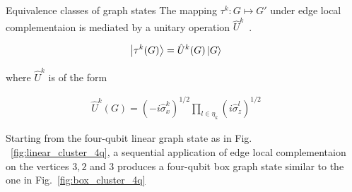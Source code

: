 \documentclass[final]{beamer}
\newlength{\sepwidth}
\newlength{\colwidth}
\newcommand{\separatorcolumn}{\begin{column}{\sepwidth}\end{column}}
\begin{document}
\begin{frame}[t]
\begin{columns}[t]
            \separatorcolumn

            \begin{column}{\colwidth}
                \begin{block}{Equivalence classes of graph states}
                    The mapping $\tau^k : G \mapsto G'$ under edge local complementaion is mediated
                    by a unitary operation
                    $\hat{U}^{k}$~\cite{PhysRevA.69.062311}.

                    \begin{align}
                        \ket{\tau^k(G)} =\hat{U}^{k}(G) \ket{G}
                        \label{eq:edge_local_complementation_mapping}
                    \end{align}

                    where $\hat{U}^{k}$ is of the form

                    \begin{align}
                        \hat{U}^{k}(G) = (-i\hat{\sigma}_x^{k})^{1/2} \displaystyle\prod_{l
                        \in \eta_k} (i \hat{\sigma}_z^{l})^{1/2}
                        \label{eq:edge_local_complementation_unitary}
                    \end{align}


                    Starting from the four-qubit linear graph state as in Fig.
                    ~\ref{fig:linear_cluster_4q}, a sequential application of edge local
                    complementaion on the vertices $3, 2$ and $3$ produces a four-qubit box
                    graph state similar to the one in Fig.~\ref{fig:box_cluster_4q}


\end{block}
\end{column}
\end{columns}
\end{frame}
\end{document}
